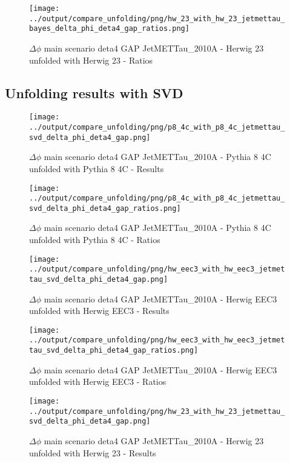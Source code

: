 \documentclass[11pt]{book}
\begin{document}
\begin{figure}[ht]
\centering
\texttt{[image: ../output/compare\_unfolding/png/hw\_23\_with\_hw\_23\_jetmettau\_bayes\_delta\_phi\_deta4\_gap\_ratios.png]}
\caption{$\Delta\phi$ main scenario deta4 GAP JetMETTau\_2010A - Herwig 23 unfolded with Herwig 23 - Ratios}
\label{hw_23_hw_23_jetmettau_bayes_delta_phi_deta4_gap_b}
\end{figure}

\clearpage
\subsection{Unfolding results with SVD}

\begin{figure}[ht]
\centering
\texttt{[image: ../output/compare\_unfolding/png/p8\_4c\_with\_p8\_4c\_jetmettau\_svd\_delta\_phi\_deta4\_gap.png]}
\caption{$\Delta\phi$ main scenario deta4 GAP JetMETTau\_2010A - Pythia 8 4C unfolded with Pythia 8 4C - Results}
\label{p8_p8_jetmettau_svd_delta_phi_deta4_gap_a}
\end{figure}

\begin{figure}[ht]
\centering
\texttt{[image: ../output/compare\_unfolding/png/p8\_4c\_with\_p8\_4c\_jetmettau\_svd\_delta\_phi\_deta4\_gap\_ratios.png]}
\caption{$\Delta\phi$ main scenario deta4 GAP JetMETTau\_2010A - Pythia 8 4C unfolded with Pythia 8 4C - Ratios}
\label{p8_p8_jetmettau_svd_delta_phi_deta4_gap_b}
\end{figure}

\begin{figure}[ht]
\centering
\texttt{[image: ../output/compare\_unfolding/png/hw\_eec3\_with\_hw\_eec3\_jetmettau\_svd\_delta\_phi\_deta4\_gap.png]}
\caption{$\Delta\phi$ main scenario deta4 GAP JetMETTau\_2010A - Herwig EEC3 unfolded with Herwig EEC3 - Results}
\label{hw_eec3_hw_eec3_jetmettau_svd_delta_phi_deta4_gap_a}
\end{figure}

\begin{figure}[ht]
\centering
\texttt{[image: ../output/compare\_unfolding/png/hw\_eec3\_with\_hw\_eec3\_jetmettau\_svd\_delta\_phi\_deta4\_gap\_ratios.png]}
\caption{$\Delta\phi$ main scenario deta4 GAP JetMETTau\_2010A - Herwig EEC3 unfolded with Herwig EEC3 - Ratios}
\label{hw_eec3_hw_eec3_jetmettau_svd_delta_phi_deta4_gap_b}
\end{figure}

\begin{figure}[ht]
\centering
\texttt{[image: ../output/compare\_unfolding/png/hw\_23\_with\_hw\_23\_jetmettau\_svd\_delta\_phi\_deta4\_gap.png]}
\caption{$\Delta\phi$ main scenario deta4 GAP JetMETTau\_2010A - Herwig 23 unfolded with Herwig 23 - Results}
\label{hw_23_hw_23_jetmettau_svd_delta_phi_deta4_gap_a}
\end{figure}
\end{document}
